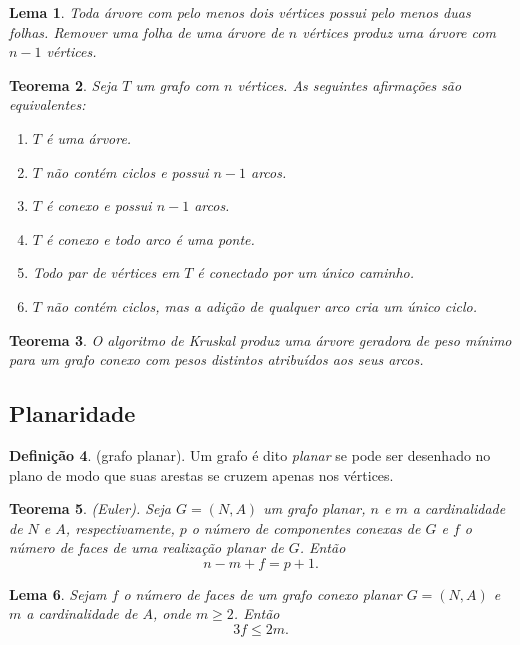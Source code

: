 \documentclass{article}
\theoremstyle{plain}
\newtheorem{thm}{Teorema}[section]
\newtheorem{lem}[thm]{Lema}
\theoremstyle{definition}
\newtheorem{defn}[thm]{Definição}
\theoremstyle{remark}
\begin{document}
\begin{lem}
    Toda árvore com pelo menos dois vértices possui pelo menos duas folhas. Remover uma folha de uma árvore de \(n\) vértices produz uma árvore com \(n-1\) vértices.
\end{lem}

\begin{thm}
    Seja \(T\) um grafo com \(n\) vértices. As seguintes afirmações são equivalentes:
    \begin{enumerate}
        \item \(T\) é uma árvore.
        \item \(T\) não contém ciclos e possui \(n-1\) arcos.
        \item \(T\) é conexo e possui \(n-1\) arcos.
        \item \(T\) é conexo e todo arco é uma ponte.
        \item Todo par de vértices em \(T\) é conectado por um único caminho.
        \item \(T\) não contém ciclos, mas a adição de qualquer arco cria um único ciclo.
    \end{enumerate}
\end{thm}

\begin{thm}
    O algoritmo de Kruskal produz uma árvore geradora de peso mínimo para um grafo conexo com pesos distintos atribuídos aos seus arcos.
\end{thm}

\subsection{Planaridade}

\begin{defn} (grafo planar).
    Um grafo é dito \emph{planar} se pode ser desenhado no plano de modo que suas arestas se cruzem apenas nos vértices.
\end{defn}

\begin{thm} (Euler).
    Seja \(G = (N, A)\) um grafo planar, \(n\) e \(m\) a cardinalidade de \(N\) e \(A\), respectivamente, \(p\) o número de componentes conexas de \(G\) e \(f\) o número de faces de uma realização planar de \(G\). Então 
    \begin{equation}
        n - m + f = p + 1.
    \end{equation}
\end{thm}

\begin{lem}
    Sejam \(f\) o número de faces de um grafo conexo planar \(G = (N, A)\) e \(m\) a cardinalidade de \(A\), onde \(m \geq 2\). Então 
    \begin{equation}
        3f \leq 2m.
    \end{equation}
\end{lem}
\end{document}
